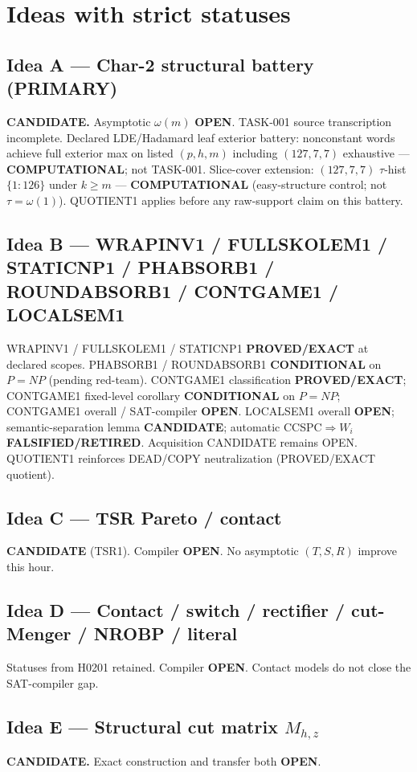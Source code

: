 \documentclass[11pt]{article}
\begin{document}
\section*{Ideas with strict statuses}
\subsection*{Idea A --- Char-2 structural battery (PRIMARY)}
\textbf{CANDIDATE.} Asymptotic $\omega(m)$ \textbf{OPEN}. TASK-001 source transcription incomplete.
Declared LDE/Hadamard leaf exterior battery: nonconstant words achieve full exterior max on
listed $(p,h,m)$ including $(127,7,7)$ exhaustive --- \textbf{COMPUTATIONAL}; not TASK-001.
Slice-cover extension: $(127,7,7)$ $\tau$-hist $\{1{:}126\}$ under $k{\ge}m$ ---
\textbf{COMPUTATIONAL} (easy-structure control; not $\tau=\omega(1)$).
QUOTIENT1 applies before any raw-support claim on this battery.

\subsection*{Idea B --- WRAPINV1 / FULLSKOLEM1 / STATICNP1 / PHABSORB1 / ROUNDABSORB1 / CONTGAME1 / LOCALSEM1}
WRAPINV1 / FULLSKOLEM1 / STATICNP1 \textbf{PROVED/EXACT} at declared scopes.
PHABSORB1 / ROUNDABSORB1 \textbf{CONDITIONAL} on $P=NP$ (pending red-team).
CONTGAME1 classification \textbf{PROVED/EXACT}; CONTGAME1 fixed-level corollary
\textbf{CONDITIONAL} on $P=NP$; CONTGAME1 overall / SAT-compiler \textbf{OPEN}.
LOCALSEM1 overall \textbf{OPEN}; semantic-separation lemma \textbf{CANDIDATE};
automatic CCSPC$\Rightarrow W_i$ \textbf{FALSIFIED/RETIRED}.
Acquisition CANDIDATE remains OPEN.
QUOTIENT1 reinforces DEAD/COPY neutralization (PROVED/EXACT quotient).

\subsection*{Idea C --- TSR Pareto / contact}
\textbf{CANDIDATE} (TSR1). Compiler \textbf{OPEN}. No asymptotic $(T,S,R)$ improve this hour.

\subsection*{Idea D --- Contact / switch / rectifier / cut-Menger / NROBP / literal}
Statuses from H0201 retained. Compiler \textbf{OPEN}. Contact models do not close the SAT-compiler gap.

\subsection*{Idea E --- Structural cut matrix $M_{h,z}$}
\textbf{CANDIDATE.} Exact construction and transfer both \textbf{OPEN}.
\end{document}
